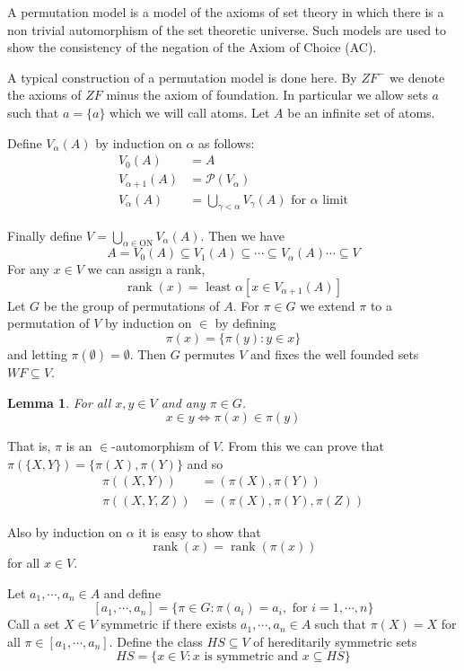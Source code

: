 \documentclass[12pt]{article}
\renewcommand{\subset}{\subseteq}
\DeclareMathOperator{\rank}{rank}
\newtheorem*{lem}{Lemma}
\begin{document}
A permutation model is a model of the axioms of set theory in which there is a non trivial automorphism of the set theoretic universe.  Such models are used to show the consistency of the negation of the Axiom of Choice (AC).  

A typical construction of a permutation model is done here.  By $ZF^-$ we denote the axioms of $ZF$ minus the axiom of foundation.  In particular we allow sets $a$ such that $a = \{a\}$ which we will call atoms.  Let $A$ be an infinite set of atoms.

Define $V_\alpha(A)$ by induction on $\alpha$ as follows:
\begin{align*}
V_0(A) &= A \\
V_{\alpha+1}(A) &= \mathcal{P}(V_\alpha) \\
V_\alpha(A) &= \bigcup_{\gamma < \alpha}V_\gamma(A)  \text{ for $\alpha$ limit}
\end{align*}

Finally define $V = \bigcup_{\alpha \in \text{ON}} V_\alpha(A)$.  Then we have
\[
A = V_0(A) \subset V_1(A) \subset \cdots \subset V_\alpha(A) \cdots \subset V
\]
For any $x \in V$ we can assign a rank,
\[
\rank(x) = \text{ least } \alpha [ x \in V_{\alpha+1}(A)]
\]
Let $G$ be the group of permutations of $A$. For $\pi \in G$ we extend $\pi$ to
a permutation of $V$ by induction on $\in$ by defining
\[
\pi(x) = \{ \pi(y) : y \in x \}
\]
and letting $\pi(\emptyset) = \emptyset$. Then $G$ permutes $V$ and fixes the well founded sets $WF \subset V$.
                                                                                
\begin{lem}
For all $x,y \in V$ and any $\pi \in G$.
\[
x \in y \iff \pi(x) \in \pi(y)
\]
\end{lem}
That is, $\pi$ is an $\in$-automorphism of $V$.  From this we can prove that $\pi(\{X,Y\}) = \{\pi(X), \pi(Y)\}$ and so
\begin{align*}
\pi((X,Y)) &= (\pi(X),\pi(Y))\\
\pi((X,Y,Z)) &= (\pi(X),\pi(Y),\pi(Z))
\end{align*}

Also by induction on $\alpha$ it is easy to show that
\[
\rank(x) = \rank(\pi(x))
\]
for all $x \in V$.

Let $a_1,\cdots,a_n \in A$ and define
\[
[ a_1, \cdots, a_n ] = \{\pi \in G : \pi(a_i) = a_i,\text{ for } i = 1, \cdots, n \}
\]
Call a set $X \in V$ symmetric if there exists $a_1,\cdots,a_n \in A$ such that $\pi(X) = X$ for all $\pi \in [a_1, \cdots, a_n]$.  Define the class $HS \subset V$ of hereditarily symmetric sets
\[
HS = \{x \in V : x \text{ is symmetric and } x \subset HS \}
\]
                                                                                
\end{document}
